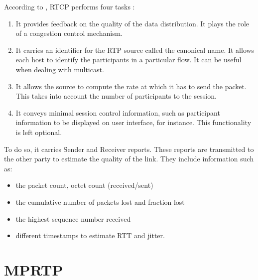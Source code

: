 According to \cite{javvin2005network}, RTCP performs four tasks : 

\begin{enumerate}
\item It provides feedback on the quality of the data distribution. It plays the role of a congestion control mechanism.
\item It carries an identifier for the RTP source called the canonical name. It allows each host to identify the participants in a particular flow. It can be useful when dealing with multicast.
\item It allows the source to compute the rate at which it has to send the packet. This takes into account the number of participants to the session.
\item It conveys minimal session control information, such as participant information to be displayed on user interface, for instance. This functionality is left optional.
\end{enumerate}

To do so, it carries Sender and Receiver reports. These reports are transmitted to the other party to estimate the quality of the link. They include information such as:

\begin{itemize}
\item the packet count, octet count (received/sent)
\item the cumulative number of packets lost and fraction lost
\item the highest sequence number received
\item different timestamps to estimate RTT and jitter.
\end{itemize}


\section{MPRTP}

